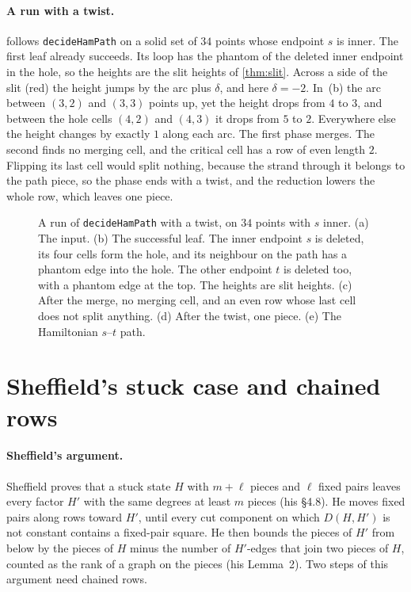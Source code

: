 \documentclass[11pt]{article}
\theoremstyle{plain}
\theoremstyle{definition}
\theoremstyle{remark}
\newcommand{\lean}[1]{\texttt{#1}}
\begin{document}
\paragraph{A run with a twist.}
 follows \lean{decideHamPath} on a solid set of $34$ points whose endpoint $s$ is
inner.
The first leaf already succeeds.
Its loop has the phantom of the deleted inner endpoint in the hole, so the heights are the slit
heights of \cref{thm:slit}.
Across a side of the slit (red) the height jumps by the arc plus $\delta$, and here $\delta=-2$.
In~(b) the arc between $(3,2)$ and $(3,3)$ points up, yet the height drops from $4$ to $3$, and
between the hole cells $(4,2)$ and $(4,3)$ it drops from $5$ to $2$.
Everywhere else the height changes by exactly $1$ along each arc.
The first phase merges.
The second finds no merging cell, and the critical cell has a row of even length $2$.
Flipping its last cell would split nothing, because the strand through it belongs to the path
piece, so the phase ends with a twist, and the reduction lowers the whole row, which leaves one piece.

\begin{figure}[p]
\centering

\caption{A run of \lean{decideHamPath} with a twist, on $34$ points with $s$ inner.
(a) The input.
(b) The successful leaf.
The inner endpoint $s$ is deleted, its four cells form the hole, and its neighbour on the path has
a phantom edge into the hole.
The other endpoint $t$ is deleted too, with a phantom edge at the top.
The heights are slit heights.
(c) After the merge, no merging cell, and an even row whose last cell does not split anything.
(d) After the twist, one piece.
(e) The Hamiltonian $s$--$t$ path.}
\label{fig:twistrun}
\end{figure}

\section{Sheffield's stuck case and chained rows}
\label{app:repair}

\paragraph{Sheffield's argument.}
Sheffield proves that a stuck state $H$ with $m+\ell$ pieces and $\ell$ fixed pairs leaves every factor
$H'$ with the same degrees at least $m$ pieces (his \S4.8).
He moves fixed pairs along rows toward $H'$, until every cut component on which $D(H,H')$ is not
constant contains a fixed-pair square.
He then bounds the pieces of $H'$ from below by the pieces of $H$ minus the number of $H'$-edges that
join two pieces of $H$, counted as the rank of a graph on the pieces (his Lemma~2).
Two steps of this argument need chained rows.
\end{document}
